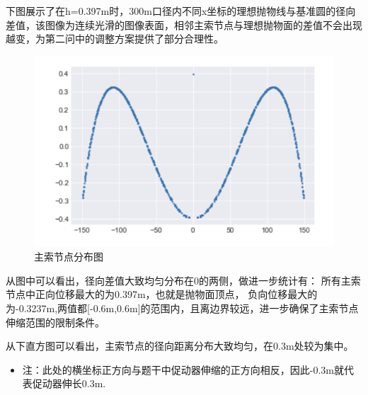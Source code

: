 \documentclass[withoutpreface,bwprint]{cumcmthesis} %
\begin{document}
下图展示了在h=0.397m时，300m口径内不同x坐标的理想抛物线与基准圆的径向差值，该图像为连续光滑的图像表面，相邻主索节点与理想抛物面的差值不会出现
越变，为第二问中的调整方案提供了部分合理性。

\begin{figure}[H]
    \centering
    \includegraphics[scale=0.34]{images/xi2.png}
    \caption{主索节点分布图}
\end{figure}


从图中可以看出，径向差值大致均匀分布在0的两侧，做进一步统计有：
所有主索节点中正向位移最大的为0.397m，也就是抛物面顶点，
负向位移最大的为-0.3237m,两值都[-0.6m,0.6m]的范围内，且离边界较远，进一步确保了主索节点伸缩范围的限制条件。


从下直方图可以看出，主索节点的径向距离分布大致均匀，在0.3m处较为集中。

\begin{itemize}
    \item 注：此处的横坐标正方向与题干中促动器伸缩的正方向相反，因此-0.3m就代表促动器伸长0.3m.
\end{itemize}
\end{document}

